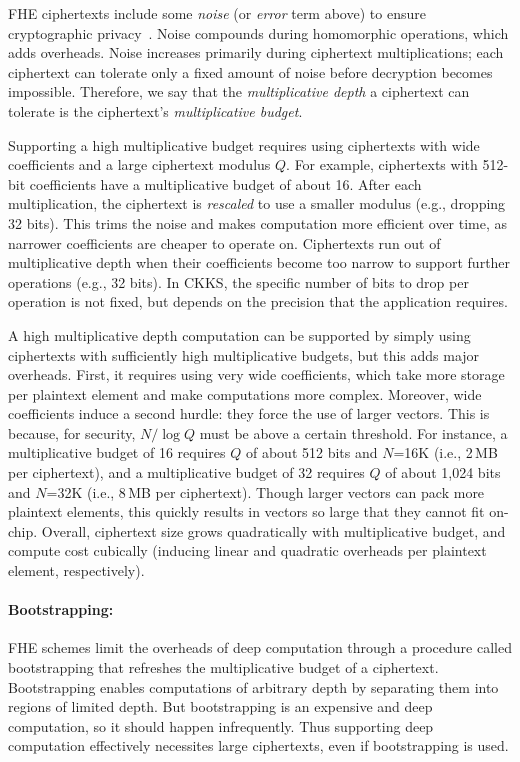 FHE ciphertexts include some \emph{noise} (or \emph{error} term above) to ensure
cryptographic privacy~\cite{lyubashevsky:tact10:ideal}. Noise compounds during
homomorphic operations, which adds overheads. Noise increases primarily during
ciphertext multiplications; each ciphertext can tolerate only a fixed amount of
noise before decryption becomes impossible. Therefore, we say that the
\emph{multiplicative depth} a ciphertext can tolerate is the ciphertext's
\emph{multiplicative budget}.

Supporting a high multiplicative budget requires using ciphertexts with wide
coefficients and a large ciphertext modulus $Q$. For example, ciphertexts with
512-bit coefficients have a multiplicative budget of about 16. After each
multiplication, the ciphertext is \emph{rescaled} to use a smaller modulus
(e.g., dropping 32 bits). This trims the noise and makes computation more
efficient over time, as narrower coefficients are cheaper to operate on.
Ciphertexts run out of multiplicative depth when their coefficients become too
narrow to support further operations (e.g., 32 bits). In CKKS, the specific
number of bits to drop per operation is not fixed, but depends on the precision
that the application requires.

A high multiplicative depth computation can be supported by simply using
ciphertexts with sufficiently high multiplicative budgets, but this adds major
overheads. First, it requires using very wide coefficients, which take more
storage per plaintext element and make computations more complex. Moreover,
wide coefficients induce a second hurdle: they force the use of larger vectors.
This is because, for security, $N/\log Q$ must be above a certain threshold.
For instance, a multiplicative budget of 16 requires $Q$ of about 512 bits and
$N$=16K (i.e., 2\,MB per ciphertext), and a multiplicative budget of 32
requires $Q$ of about 1,024 bits and $N$=32K (i.e., 8\,MB per ciphertext).
Though larger vectors can pack more plaintext elements, this quickly results in
vectors so large that they cannot fit on-chip. Overall, ciphertext size grows
quadratically with multiplicative budget, and compute cost cubically (inducing
linear and quadratic overheads per plaintext element, respectively).


\paragraph{Bootstrapping:} FHE schemes limit the overheads of deep computation
through a procedure called bootstrapping that refreshes the multiplicative
budget of a ciphertext. Bootstrapping enables computations of arbitrary depth
by separating them into regions of limited depth. But
bootstrapping is an expensive and deep computation, so it should happen
infrequently. Thus supporting deep computation effectively necessites large
ciphertexts, even if bootstrapping is used.


